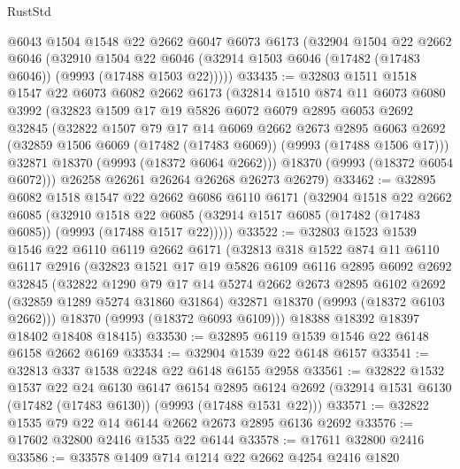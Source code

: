\begin{lexlean}{RustStd}
\begin{coremodule}
    @6043
    @1504
    @1548
    @22
    @2662
    @6047
    @6073
    @6173
    (@32904
      @1504
      @22
      @2662
      @6046
      (@32910
        @1504
        @22
        @6046
        (@32914 @1503 @6046 (@17482 (@17483 @6046)) (@9993 (@17488 @1503 @22)))))
@33435 := @32803
    @1511
    @1518
    @1547
    @22
    @6073
    @6082
    @2662
    @6173
    (@32814
      @1510
      @874
      @11
      @6073
      @6080
      @3992
      (@32823
        @1509
        @17
        @19
        @5826
        @6072
        @6079
        @2895
        @6053
        @2692
        @32845
        (@32822
          @1507
          @79
          @17
          @14
          @6069
          @2662
          @2673
          @2895
          @6063
          @2692
          (@32859 @1506 @6069 (@17482 (@17483 @6069)) (@9993 (@17488 @1506 @17)))
          @32871
          @18370
          (@9993 (@18372 @6064 @2662)))
        @18370
        (@9993 (@18372 @6054 @6072)))
      @26258
      @26261
      @26264
      @26268
      @26273
      @26279)
@33462 := @32895
    @6082
    @1518
    @1547
    @22
    @2662
    @6086
    @6110
    @6171
    (@32904
      @1518
      @22
      @2662
      @6085
      (@32910
        @1518
        @22
        @6085
        (@32914 @1517 @6085 (@17482 (@17483 @6085)) (@9993 (@17488 @1517 @22)))))
@33522 := @32803
    @1523
    @1539
    @1546
    @22
    @6110
    @6119
    @2662
    @6171
    (@32813
      @318
      @1522
      @874
      @11
      @6110
      @6117
      @2916
      (@32823
        @1521
        @17
        @19
        @5826
        @6109
        @6116
        @2895
        @6092
        @2692
        @32845
        (@32822
          @1290
          @79
          @17
          @14
          @5274
          @2662
          @2673
          @2895
          @6102
          @2692
          (@32859 @1289 @5274 @31860 @31864)
          @32871
          @18370
          (@9993 (@18372 @6103 @2662)))
        @18370
        (@9993 (@18372 @6093 @6109)))
      @18388
      @18392
      @18397
      @18402
      @18408
      @18415)
@33530 := @32895 @6119 @1539 @1546 @22 @6148 @6158 @2662 @6169
@33534 := @32904 @1539 @22 @6148 @6157
@33541 := @32813 @337 @1538 @2248 @22 @6148 @6155 @2958
@33561 := @32822
    @1532
    @1537
    @22
    @24
    @6130
    @6147
    @6154
    @2895
    @6124
    @2692
    (@32914 @1531 @6130 (@17482 (@17483 @6130)) (@9993 (@17488 @1531 @22)))
@33571 := @32822 @1535 @79 @22 @14 @6144 @2662 @2673 @2895 @6136 @2692
@33576 := @17602 @32800 @2416 @1535 @22 @6144
@33578 := @17611 @32800 @2416
@33586 := @33578 @1409 @714 @1214 @22 @2662 @4254 @2416 @1820

\end{coremodule}
\end{lexlean}
